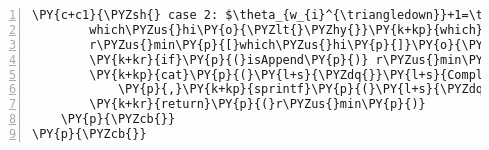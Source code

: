 \begin{Verbatim}[commandchars=\\\{\},codes={\catcode`\$=3\catcode`\^=7\catcode`\_=8},gobble=0,numbers=left,fontfamily=fvm,fontshape=n,fontsize=\footnotesize,tabsize=2]
		\PY{c+c1}{\PYZsh{} case 2: $\theta_{w_{i}^{\triangledown}}+1=\theta_{w_{i}^{\vartriangle}}$}
		which\PYZus{}hi\PY{o}{\PYZlt{}\PYZhy{}}\PY{k+kp}{which}\PY{p}{(}k\PYZus{}blocks\PY{p}{[}lo\PYZus{}bounds\PY{l+m}{+1}\PY{p}{]}\PY{o}{==}k\PYZus{}blocks\PY{p}{[}hi\PYZus{}bounds\PY{l+m}{+2}\PY{p}{]}\PY{p}{)}
		r\PYZus{}min\PY{p}{[}which\PYZus{}hi\PY{p}{]}\PY{o}{\PYZlt{}\PYZhy{}}g\PY{p}{[}hi\PYZus{}bounds\PY{p}{[}which\PYZus{}hi\PY{p}{]]}
		\PY{k+kr}{if}\PY{p}{(}isAppend\PY{p}{)} r\PYZus{}min\PY{o}{\PYZlt{}\PYZhy{}}r\PYZus{}min\PY{p}{[}\PY{o}{\PYZhy{}}nx\PY{p}{]}
		\PY{k+kp}{cat}\PY{p}{(}\PY{l+s}{\PYZdq{}}\PY{l+s}{Completed morphological erosion (cts scale) in\PYZdq{}}
			\PY{p}{,}\PY{k+kp}{sprintf}\PY{p}{(}\PY{l+s}{\PYZdq{}}\PY{l+s}{\PYZpc{}.2f\PYZdq{}}\PY{p}{,}\PY{k+kp}{proc.time}\PY{p}{(}\PY{p}{)}\PY{p}{[}\PY{l+m}{3}\PY{p}{]}\PY{o}{\PYZhy{}}t1\PY{p}{)}\PY{p}{,}\PY{l+s}{\PYZdq{}}\PY{l+s}{seconds \PYZbs{}n\PYZdq{}}\PY{p}{)}
		\PY{k+kr}{return}\PY{p}{(}r\PYZus{}min\PY{p}{)}
	\PY{p}{\PYZcb{}}
\PY{p}{\PYZcb{}}
\end{Verbatim}

